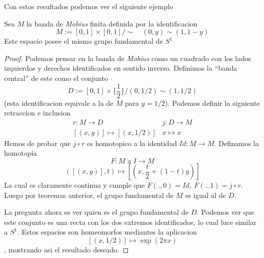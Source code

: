 Con estos resultados podemos ver el siguiente ejemplo
\begin{corolario}
  Sea \(M\) la banda de \emph{Mobius} finita definida por la identificacion
  \[ M := [0,1] \times [0,1] / \sim \quad (0,y) \sim (1, 1 - y) \]
  Este espacio posee el mismo grupo fundamental de \(S^1\)
\end{corolario}
\begin{proof}
  Podemos pensar en la banda de \emph{Mobius} como un cuadrado con los
  lados izquierdos y derechos identificados en sentido inverso.
  Definimos la ``banda central'' de este como el conjunto
  \[ D := [0,1] \times \{\frac 1 2\} / (0, 1 / 2) \sim (1,1 / 2) \]
  (esta identificacion equivale a la de \(M\) para \(y = 1/2\)). Podemos
  definir la siguiente retraccion e inclusion
  \[
    \begin{matrix}
      r : M \to D & j : D \to M \\
      [(x,y)] \mapsto [(x, 1/2)] & x \mapsto x
    \end{matrix}
  \]
  Hemos de probar que \(j \circ r\) es homotopico a la identidad \(Id
  : M \to M\). Definamos la homotopia
  \[ F : M \times I \to M \]
  \[ ([(x,y)], t) \mapsto [(x, \frac t 2 + (1-t) y)] \]
  La cual es claramente continua y cumple que \( F(.,0) = Id,\ F(.,1) =
  j \circ r\). Luego por teoremas anterior, el grupo fundamental de
  \(M\) es igual al de \(D\).

  La pregunta ahora es ver quien es el grupo fundamental de \(D\).
  Podemos ver que este conjunto es una recta con los dos extremos
  identificados, lo cual luce similar a \(S^1\). Estos espacios son
  homeomorfos mediantes la aplicacion \[[(x, 1/2)] \mapsto \exp (2 \pi
  x)\], mostrando asi el resultado deseado.

\end{proof}
